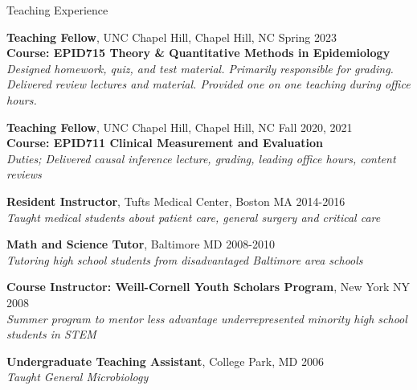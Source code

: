 \documentclass{resume} %
\begin{document}

\begin{rSection}{Teaching Experience}

    {\bf Teaching Fellow}{, UNC Chapel Hill, Chapel Hill, NC} \hfill {Spring 2023}
   \\ 
   \textbf{Course: EPID715 Theory \& Quantitative Methods in Epidemiology}
   \\
   \textit{Designed homework, quiz, and test material. Primarily responsible for grading. Delivered review lectures and material. Provided one on one teaching during office hours.}
   
   {\bf Teaching Fellow}{, UNC Chapel Hill, Chapel Hill, NC} \hfill {Fall 2020, 2021}
   \\
   \textbf{Course: EPID711 Clinical Measurement and Evaluation}
   \\ 
   \textit{Duties; Delivered causal inference lecture, grading, leading office hours, content reviews}

   {\bf Resident Instructor}{, Tufts Medical Center, Boston MA} \hfill {2014-2016}
   \\ 
   \textit{Taught medical students about patient care, general surgery and critical care}
   
   {\bf Math and Science Tutor}{, Baltimore MD} \hfill {2008-2010}
   \\ 
   \textit{Tutoring high school students from disadvantaged Baltimore area schools}
   
   {\bf Course Instructor: Weill-Cornell Youth Scholars Program}{, New York NY} \hfill {2008}
   \\ 
   \textit{Summer program to mentor less advantage underrepresented minority high school students in STEM
   } 
   
   {\bf Undergraduate Teaching Assistant}{, College Park, MD} \hfill {2006}
   \\ 
   \textit{Taught General Microbiology}
   \end{rSection}
   
\end{document}
